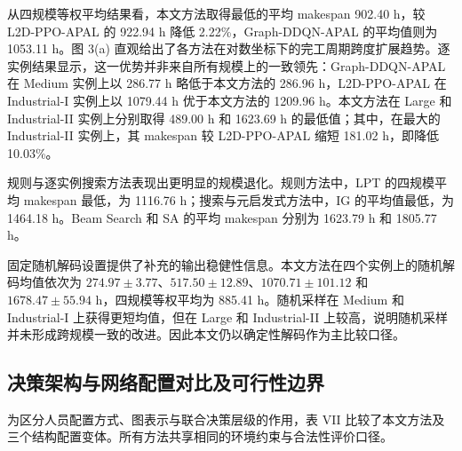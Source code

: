 \documentclass[journal,10pt]{IEEEtran}
\begin{document}
从四规模等权平均结果看，本文方法取得最低的平均 makespan 902.40 h，较 L2D-PPO-APAL 的 922.94 h 降低 2.22\%，Graph-DDQN-APAL 的平均值则为 1053.11 h。图 3(a) 直观给出了各方法在对数坐标下的完工周期跨度扩展趋势。逐实例结果显示，这一优势并非来自所有规模上的一致领先：Graph-DDQN-APAL 在 Medium 实例上以 286.77 h 略低于本文方法的 286.96 h，L2D-PPO-APAL 在 Industrial-I 实例上以 1079.44 h 优于本文方法的 1209.96 h。本文方法在 Large 和 Industrial-II 实例上分别取得 489.00 h 和 1623.69 h 的最低值；其中，在最大的 Industrial-II 实例上，其 makespan 较 L2D-PPO-APAL 缩短 181.02 h，即降低 10.03\%。

规则与逐实例搜索方法表现出更明显的规模退化。规则方法中，LPT 的四规模平均 makespan 最低，为 1116.76 h；搜索与元启发式方法中，IG 的平均值最低，为 1464.18 h。Beam Search 和 SA 的平均 makespan 分别为 1623.79 h 和 1805.77 h。

固定随机解码设置提供了补充的输出稳健性信息。本文方法在四个实例上的随机解码均值依次为 $274.97\pm3.77$、$517.50\pm12.89$、$1070.71\pm101.12$ 和 $1678.47\pm55.94$ h，四规模等权平均为 885.41 h。随机采样在 Medium 和 Industrial-I 上获得更短均值，但在 Large 和 Industrial-II 上较高，说明随机采样并未形成跨规模一致的改进。因此本文仍以确定性解码作为主比较口径。

\subsection{决策架构与网络配置对比及可行性边界}\label{sec:ablations}

为区分人员配置方式、图表示与联合决策层级的作用，表 VII 比较了本文方法及三个结构配置变体。所有方法共享相同的环境约束与合法性评价口径。
\end{document}
